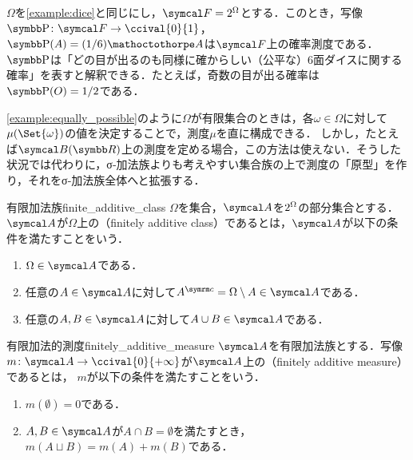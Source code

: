 \documentclass[../../main]{subfiles}
\begin{document}
\begin{example}\label{example:equally_possible}
  \(\Omega\)を\cref{example:dice}と同じにし，\(\sigmaalg{F}=\powerset{\Omega}\)とする．このとき，写像\(\prob\colon\sigmaalg{F}\to\ccival{0}{1}\)，\(\prob(A)=(1/6)\sizeof{A}\)は\(\sigmaalg{F}\)上の確率測度である．
  \(\prob\)は「どの目が出るのも同様に確からしい（公平な）6面ダイスに関する確率」を表すと解釈できる．たとえば，奇数の目が出る確率は\(\prob(O)=1/2\)である．
\end{example}

\cref{example:equally_possible}のように\(\Omega\)が有限集合のときは，各\(\omega\in\Omega\)に対して\(\mu(\Set{\omega})\)の値を決定することで，測度\(\mu\)を直に構成できる．
しかし，たとえば\(\sigmaalg{B}(\numset{R})\)上の測度を定める場合，この方法は使えない．そうした状況では代わりに，σ‐加法族よりも考えやすい集合族の上で測度の「原型」を作り，それをσ‐加法族全体へと拡張する．

\begin{definition}{有限加法族}{finite_additive_class}
  \(\Omega\)を集合，\(\sigmaalg{A}\)を\(2^{\Omega}\)の部分集合とする．
  \(\sigmaalg{A}\)が\(\Omega\)上の（finitely additive class）であるとは，\(\sigmaalg{A}\)が以下の条件を満たすことをいう．
  \begin{enumerate}
    \item \(\Omega\in\sigmaalg{A}\)である．
    \item 任意の\(A\in\sigmaalg{A}\)に対して\(\scomp{A}=\Omega\setminus A\in\sigmaalg{A}\)である．
    \item 任意の\(A,B\in\sigmaalg{A}\)に対して\(A\cup B\in\sigmaalg{A}\)である．
  \end{enumerate}
\end{definition}

\begin{definition}{有限加法的測度}{finitely_additive_measure}
  \(\sigmaalg{A}\)を有限加法族とする．写像\(m\colon\sigmaalg{A}\to\ccival{0}{+\infty}\)が\(\sigmaalg{A}\)上の（finitely additive measure）であるとは，
  \(m\)が以下の条件を満たすことをいう．
  \begin{enumerate}
    \item \(m(\emptyset)=0\)である．
    \item \(A,B\in\sigmaalg{A}\)が\(A\cap B=\emptyset\)を満たすとき，\(m(A\sqcup B)=m(A)+m(B)\)である．
  \end{enumerate}
\end{definition}
\end{document}
